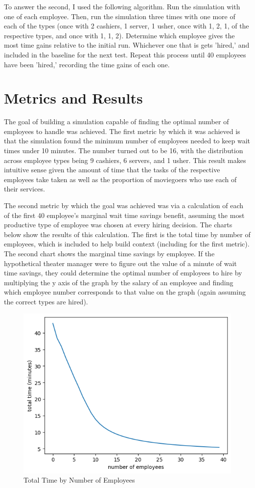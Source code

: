 \documentclass[10pt,twocolumn]{article}
\begin{document}
To answer the second, I used the following algorithm. Run the simulation with one of each employee. Then, run the simulation three times with one more of each of the types (once with 2 cashiers, 1 server, 1 usher, once with 1, 2, 1, of the respective types, and once with 1, 1, 2). Determine which employee gives the most time gains relative to the initial run. Whichever one that is gets 'hired,' and included in the baseline for the next test. Repeat this process until 40 employees have been 'hired,' recording the time gains of each one. 

\section{Metrics and Results}

The goal of building a simulation capable of finding the optimal number of employees to handle was achieved. The first metric by which it was achieved is that the simulation found the minimum number of employees needed to keep wait times under 10 minutes. The number turned out to be 16, with the distribution across employee types being 9 cashiers, 6 servers, and 1 usher. This result makes intuitive sense given the amount of time that the tasks of the respective employees take taken as well as the proportion of moviegoers who use each of their services. 

The second metric by which the goal was achieved was via a calculation of each of the first 40 employee's marginal wait time savings benefit, assuming the most productive type of employee was chosen at every hiring decision. The charts below show the results of this calculation. The first is the total time by number of employees, which is included to help build context (including for the first metric). The second chart shows the marginal time savings by employee. If the hypothetical theater manager were to figure out the value of a minute of wait time savings, they could determine the optimal number of employees to hire by multiplying the y axis of the graph by the salary of an employee and finding which employee number corresponds to that value on the graph (again assuming the correct types are hired). 
\begin{figure}[H]
    \centering
    \includegraphics[width=0.9\linewidth]{totals.png}
    \caption{Total Time by Number of Employees}
    \label{fig:enter-label}
\end{figure}
\end{document}
